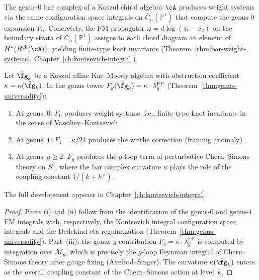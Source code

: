 \begin{remark}
\label{rem:genus-0-weight-systems}
The genus-$0$ bar complex of a Koszul chiral algebra $\cA$
produces weight systems via the same configuration space integrals
on $\overline{C}_n(\mathbb{P}^1)$ that compute the genus-$0$
expansion $F_0$.  Concretely, the FM propagator
$\omega = d\log(z_1 - z_2)$ on the boundary strata of
$\overline{C}_n(\mathbb{P}^1)$ assigns to each chord diagram
an element of $H^*(\bar{B}^{\mathrm{ch}}(\cA))$, yielding
finite-type knot invariants
(Theorem~\ref{thm:bar-weight-systems},
Chapter~\ref{ch:kontsevich-integral}).
\end{remark}

\begin{proposition}
\label{prop:loop-expansion-knots}
Let $\hat{\fg}_k$ be a Koszul affine Kac--Moody algebra with
obstruction coefficient $\kappa = \kappa(\hat{\fg}_k)$.  In the
genus tower $F_g(\hat{\fg}_k) = \kappa \cdot \lambda_g^{\mathrm{FP}}$
\textup{(}Theorem~\textup{\ref{thm:genus-universality})}:
\begin{enumerate}
\item At genus~$0$: $F_0$ produces weight systems, i.e.,
  finite-type knot invariants in the sense of Vassiliev--Kontsevich.
\item At genus~$1$: $F_1 = \kappa/24$ produces the writhe correction
  \textup{(}framing anomaly\textup{)}.
\item At genus~$g \geq 2$: $F_g$ produces the $g$-loop term of
  perturbative Chern--Simons theory on $S^3$, where the bar complex
  curvature $\kappa$ plays the role of the coupling constant
  $1/(k + h^{\vee})$.
\end{enumerate}
The full development appears in Chapter~\textup{\ref{ch:kontsevich-integral}}.
\end{proposition}

\begin{proof}
Parts (i) and (ii) follow from the identification of the genus-$0$
and genus-$1$ FM integrals with, respectively, the Kontsevich integral
configuration space integrals and the Dedekind eta regularization
(Theorem~\ref{thm:genus-universality}).  Part~(iii): the genus-$g$
contribution $F_g = \kappa \cdot \lambda_g^{\mathrm{FP}}$ is computed
by integration over $\overline{\mathcal{M}}_g$, which is precisely the
$g$-loop Feynman integral of Chern--Simons theory after gauge fixing
(Axelrod--Singer).  The curvature $\kappa(\hat{\fg}_k)$ enters as the
overall coupling constant of the Chern--Simons action at level~$k$.
\end{proof}

